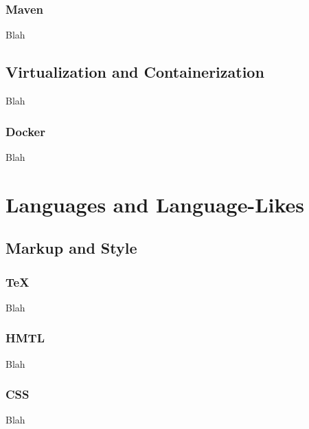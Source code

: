 
\subsubsection{Maven}

Blah


\subsection{Virtualization and Containerization}

Blah

\subsubsection{Docker}

Blah


\toclineskip
\section{Languages and Language-Likes}


\subsection{Markup and Style}

\subsubsection{TeX}

Blah

\subsubsection{HMTL}

Blah

\subsubsection{CSS}

Blah


